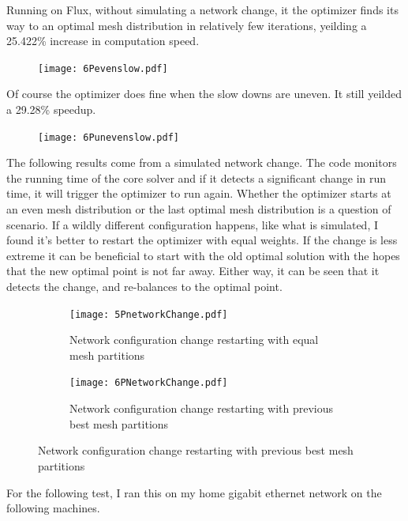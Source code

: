 \documentclass[12pt,parskip=full]{article}
\numberwithin{subsection}{section}
\begin{document}
		Running on Flux, without simulating a network change, it the optimizer finds its way to an optimal mesh distribution in relatively few iterations,
		yeilding a 25.422\% increase in computation speed.

		\begin{figure}[H]
			\centering
			\texttt{[image: 6Pevenslow.pdf]}
		\end{figure}

		Of course the optimizer does fine when the slow downs are uneven. It still yeilded a 29.28\% speedup.
		\begin{figure}[H]
			\centering
			\texttt{[image: 6Punevenslow.pdf]}
		\end{figure}

		The following results come from a simulated network change. The code monitors the running time of the core solver and if it detects a significant
		change in run time, it will trigger the optimizer to run again. Whether the optimizer starts at an even mesh distribution or the last optimal mesh
		distribution is a question of scenario. If a wildly different configuration happens, like what is simulated, I found it's better to restart
		the optimizer with equal weights. If the change is less extreme it can be beneficial to start with the old optimal solution with the hopes
		that the new optimal point is not far away. Either way, it can be seen that it detects the change, and re-balances to the optimal point.
		\begin{figure}[H]
			\centering
			\begin{subfigure}[H]{0.9\textwidth}
				\texttt{[image: 5PnetworkChange.pdf]}
				\caption{Network configuration change restarting with equal mesh partitions}
			\end{subfigure}
			\begin{subfigure}[H]{0.9\textwidth}
				\texttt{[image: 6PNetworkChange.pdf]}
				\caption{Network configuration change restarting with previous best mesh partitions}
			\end{subfigure}
		\end{figure}

		For the following test, I ran this on my home gigabit ethernet network on the following machines.
\end{document}
